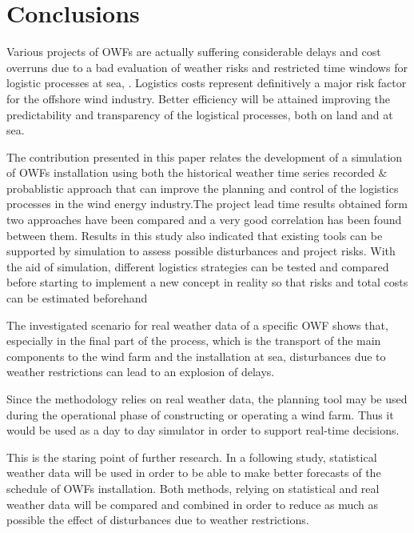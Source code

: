 \section{Conclusions}
Various projects of OWFs are actually suffering considerable delays and cost overruns due to a bad evaluation of weather risks and restricted time windows for logistic processes at sea, \cite{TCE12, ISOPE2013}. Logistics costs represent definitively a major risk factor for the offshore wind industry. Better efficiency will be attained improving the predictability and transparency of the logistical processes, both on land and at sea.

The contribution presented in this paper relates the development of a simulation of OWFs installation using both the historical weather time series recorded $\&$ probablistic approach that can improve the planning and control of the logistics processes in the wind energy industry.The project lead time results obtained form two approaches have been compared and a very good correlation has been found between them. Results in this study also  indicated that existing tools can be supported by simulation to assess possible disturbances and project risks. With the aid of simulation, different logistics strategies can be tested and compared before starting to implement a new concept in reality so that risks and total costs can be estimated beforehand

The investigated scenario for real weather data of a specific OWF shows that, especially in the final part of the process, which is the transport of the main components to the wind farm and the installation at sea, disturbances due to weather restrictions can lead to an explosion of delays. 

Since the methodology relies on real weather data, the planning tool may be used during the operational phase of constructing or operating a wind farm. Thus it would be used as a day to day simulator in order to support real-time decisions.

This is the staring point of further research. In a following study, statistical weather data will be used in order to be able to make better forecasts of the schedule of OWFs installation. Both methods, relying on statistical and real weather data will be compared and combined in order to reduce as much as possible the effect of disturbances due to weather restrictions.